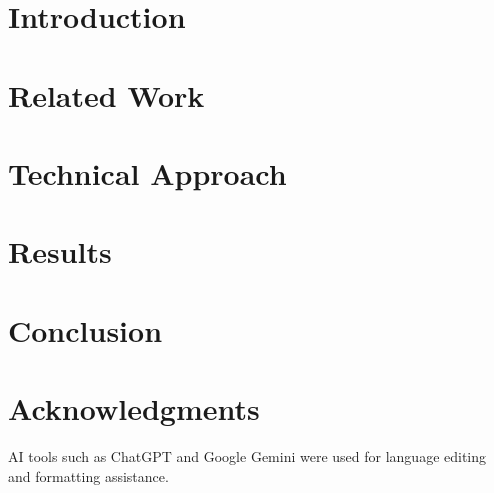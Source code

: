 \documentclass[conference,letterpaper]{IEEEtran}
\begin{document}
\section{Introduction}

\section{Related Work}

\section{Technical Approach}

\section{Results}

\section{Conclusion}

% 

\section*{Acknowledgments}
AI tools such as ChatGPT and Google Gemini were used for language editing and formatting assistance.

\end{document}

